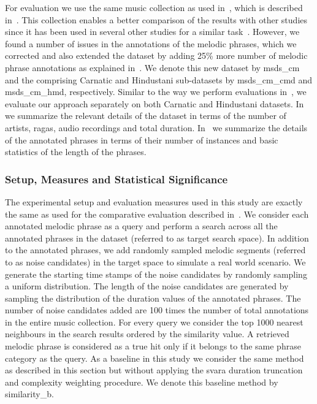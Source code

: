 For evaluation we use the same music collection as used in~, which is described in~. This collection enables a better comparison of the results with other studies since it has been used in several other studies for a similar task~\citep{Rao2014,Ross2012b}. However, we found a number of issues in the annotations of the melodic phrases, which we corrected and also extended the dataset by adding 25\% more number of melodic phrase annotations as explained in~. We denote this new dataset by \acrshort{msds_cm} and the comprising Carnatic and Hindustani sub-datasets by \acrshort{msds_cm_cmd} and \acrshort{msds_cm_hmd}, respectively. Similar to the way we perform evaluations in~, we evaluate our approach separately on both Carnatic and Hindustani datasets. In~ we summarize the relevant details of the dataset in terms of the number of artists, \glspl{raga}, audio recordings and total duration. In~ we summarize the details of the annotated phrases in terms of their number of instances and basic statistics of the length of the phrases.


\subsubsection{Setup, Measures and Statistical Significance}
\label{sec:patterns_improving_similarity_experimental_setup}

The experimental setup and evaluation measures used in this study are exactly the same as used for the comparative evaluation described in~. We consider each annotated melodic phrase as a query and perform a search across all the annotated phrases in the dataset (referred to as target search space). In addition to the annotated phrases, we add randomly sampled melodic segments (referred to as noise candidates) in the target space to simulate a real world scenario. We generate the starting time stamps of the noise candidates by randomly sampling a uniform distribution. The length of the noise candidates are generated by sampling the distribution of the duration values of the annotated phrases. The number of noise candidates added are 100 times the number of total annotations in the entire music collection. For every query we consider the top 1000 nearest neighbours in the search results ordered by the similarity value. A retrieved melodic phrase is considered as a true hit only if it belongs to the same phrase category as the query. As a baseline in this study we consider the same method as described in this section but without applying the \gls{svara} duration truncation and complexity weighting procedure. We denote this baseline method by \acrshort{similarity_b}.

